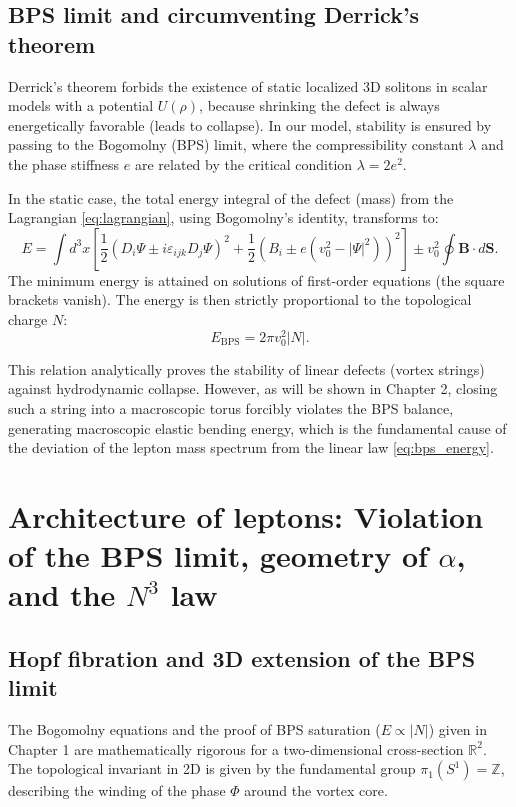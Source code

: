 \documentclass[11pt,a4paper]{article}
\begin{document}
\subsection{BPS limit and circumventing Derrick's theorem}
Derrick's theorem forbids the existence of static localized 3D solitons in scalar models with a potential $U(\rho)$, because shrinking the defect is always energetically favorable (leads to collapse). 
In our model, stability is ensured by passing to the Bogomolny (BPS) limit, where the compressibility constant $\lambda$ and the phase stiffness $e$ are related by the critical condition $\lambda = 2e^2$.
	
In the static case, the total energy integral of the defect (mass) from the Lagrangian \eqref{eq:lagrangian}, using Bogomolny's identity, transforms to:
\begin{equation}
E = \int d^3x \left[ \frac{1}{2} \left( D_i \Psi \pm i \varepsilon_{ijk} D_j \Psi \right)^2 + \frac{1}{2} \left( B_i \pm e(v_0^2 - |\Psi|^2) \right)^2 \right] \pm v_0^2 \oint \mathbf{B} \cdot d\mathbf{S}.
\end{equation}
The minimum energy is attained on solutions of first-order equations (the square brackets vanish). The energy is then strictly proportional to the topological charge $N$:
\begin{equation}
E_{\text{BPS}} = 2\pi v_0^2 |N|.
\label{eq:bps_energy}
\end{equation}
	
This relation analytically proves the stability of linear defects (vortex strings) against hydrodynamic collapse. However, as will be shown in Chapter 2, closing such a string into a macroscopic torus forcibly violates the BPS balance, generating macroscopic elastic bending energy, which is the fundamental cause of the deviation of the lepton mass spectrum from the linear law \eqref{eq:bps_energy}.
	
\section{Architecture of leptons: Violation of the BPS limit, geometry of $\alpha$, and the $N^3$ law}
	
\subsection{Hopf fibration and 3D extension of the BPS limit}
The Bogomolny equations and the proof of BPS saturation ($E \propto |N|$) given in Chapter 1 are mathematically rigorous for a two-dimensional cross-section $\mathbb{R}^2$. The topological invariant in 2D is given by the fundamental group $\pi_1(S^1) = \mathbb{Z}$, describing the winding of the phase $\Phi$ around the vortex core. 
\end{document}
